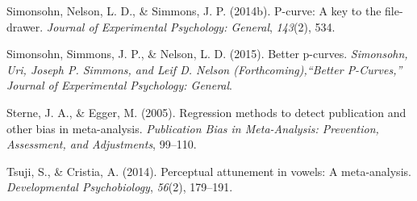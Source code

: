 \documentclass[english,floatsintext,man]{apa6}
\begin{document}
\hypertarget{ref-simonsohn2014p}{}
Simonsohn, Nelson, L. D., \& Simmons, J. P. (2014b). P-curve: A key to
the file-drawer. \emph{Journal of Experimental Psychology: General},
\emph{143}(2), 534.

\hypertarget{ref-simonsohn2015better}{}
Simonsohn, Simmons, J. P., \& Nelson, L. D. (2015). Better p-curves.
\emph{Simonsohn, Uri, Joseph P. Simmons, and Leif D. Nelson
(Forthcoming),``Better P-Curves,'' Journal of Experimental Psychology:
General}.

\hypertarget{ref-sterne2005regression}{}
Sterne, J. A., \& Egger, M. (2005). Regression methods to detect
publication and other bias in meta-analysis. \emph{Publication Bias in
Meta-Analysis: Prevention, Assessment, and Adjustments}, 99--110.

\hypertarget{ref-tsuji2014perceptual}{}
Tsuji, S., \& Cristia, A. (2014). Perceptual attunement in vowels: A
meta-analysis. \emph{Developmental Psychobiology}, \emph{56}(2),
179--191.
\end{document}
